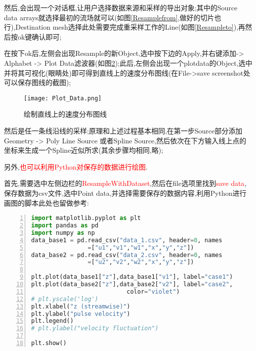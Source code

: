 然后,会出现一个对话框,让用户选择数据来源和采样的导出对象;其中的Source data arrays就选择最初的流场就可以(如图\ref{Resamplefrom},做好的切片也行),Destination mesh选择此处需要完成重采样工作的Line(如图\ref{Resampleto}),再然后按ok键确认即可;

\begin{figure}[H]
	\centering  %
	\label{Fig.main}
\end{figure}

在按下ok后,左侧会出现Resample的新Object,选中按下边的Apply,并右键添加-> Alphabet -> Plot Data滤波器(如图\ref{Plotdata});此后,左侧会出现一个plotdata的Object,选中并将其可视化(眼睛处)即可得到直线上的速度分布图线(在File->save screenshot处可以保存图线的截图);

\begin{figure}[h]
	\noindent
	\centering
	\texttt{[image: Plot\_Data.png]}
	\caption{绘制直线上的速度分布图线}
	\label{Plotdata}
\end{figure}

然后是任一条线沿线的采样;原理和上述过程基本相同,在第一步Source部分添加Geometry -> Poly Line Source 或者Spline Source,然后依次在下方输入线上点的坐标来生成一个Spline近似所求(其余步骤均相同,略);


另外,\textcolor{red}{也可以利用Python对保存的数据进行绘图}.\par
首先,需要选中左侧边栏的\textcolor{red}{ResampleWithDataset},然后在file选项里找到\textcolor{red}{save data},保存数据为csv文件,选中Point data,并选择需要保存的数据内容,利用Python进行画图的脚本此处也留做参考:


\begin{lstlisting}[numbers=left,frame=single,language=Python]
import matplotlib.pyplot as plt
import pandas as pd
import numpy as np
data_base1 = pd.read_csv("data_1.csv", header=0, names
				=["u1","v1","w1","x","y","z"])
data_base2 = pd.read_csv("data_2.csv", header=0, names
				=["u2","v2","w2","x","y","z"])

plt.plot(data_base1["z"],data_base1["v1"], label="case1")
plt.plot(data_base2["z"],data_base2["v2"], label="case2",
					       color="violet")
# plt.yscale('log')
plt.xlabel("z (streamwise)")
plt.ylabel("pulse velocity")
plt.legend()
# plt.ylabel("velocity fluctuation")

plt.show()
\end{lstlisting}
\par


